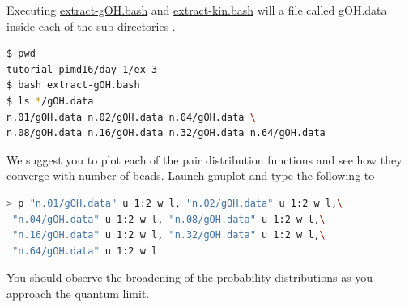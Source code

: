 \documentclass{article}
\begin{document}
\begin{Exercise}[label={water},title={Benchmark of quantum effects in a water molecule}]
\Question
Executing \url{extract-gOH.bash} and \url{extract-kin.bash} will a file called gOH.data inside each of the sub directories .
\begin{lstlisting}[language=bash]
$ pwd
tutorial-pimd16/day-1/ex-3
$ bash extract-gOH.bash
$ ls */gOH.data  
n.01/gOH.data n.02/gOH.data n.04/gOH.data \
n.08/gOH.data n.16/gOH.data n.32/gOH.data n.64/gOH.data
\end{lstlisting}
We suggest you to plot each of the pair distribution functions and see how they converge with number of beads. Launch \url{gnuplot} and type the following to

\begin{lstlisting}[language=bash]
> p "n.01/gOH.data" u 1:2 w l, "n.02/gOH.data" u 1:2 w l,\
 "n.04/gOH.data" u 1:2 w l, "n.08/gOH.data" u 1:2 w l,\
 "n.16/gOH.data" u 1:2 w l, "n.32/gOH.data" u 1:2 w l,\
 "n.64/gOH.data" u 1:2 w l
\end{lstlisting}
You should observe the broadening of the probability distributions as you approach the quantum limit.
\end{Exercise}
\end{document}
